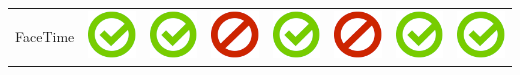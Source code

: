 \documentclass[10pt,foldmark,tumble]{leaflet}
\begin{document}
{{\begin{tabular}{ L{2cm} | C{2cm} | C{2cm} | C{2cm} | C{2cm} | C{2cm} | C{2cm} | C{2cm} | }
FaceTime & \includegraphics[scale=0.1]{pics/haken.png} & \includegraphics[scale=0.1]{pics/haken.png} & \includegraphics[scale=0.1]{pics/nohaken.png} & \includegraphics[scale=0.1]{pics/haken.png} & \includegraphics[scale=0.1]{pics/nohaken.png} & \includegraphics[scale=0.1]{pics/haken.png} & \includegraphics[scale=0.1]{pics/haken.png} \tabularnewline

\end{tabular}}}
\end{document}
